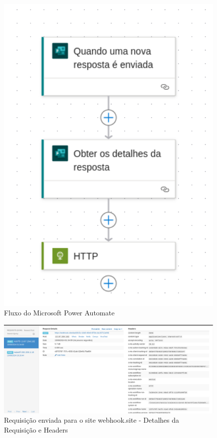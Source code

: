 \begin{figure}[H]
    \centering
    \includegraphics[width=1\textwidth]{figuras/mpa_geral_vision.png}
    \caption{Fluxo do Microsoft Power Automate}
    \label{fig:report_questions}
\end{figure}

\begin{figure}[H]
    \centering
    \includegraphics[width=1\textwidth]{figuras/webhook_1.png}
    \caption{Requisição enviada para o site webhook.site - Detalhes da Requisição e Headers}
    \label{fig:report_questions}
\end{figure}

